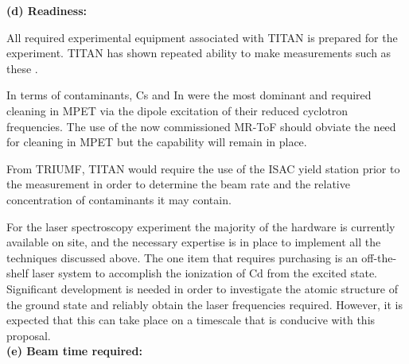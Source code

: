 \documentclass[12pt]{article}
\begin{document}
\noindent\textbf{(d) Readiness:}


All required experimental equipment associated with TITAN is prepared for the experiment. TITAN has shown repeated ability to make measurements such as these \cite{Gallant2012a,Simon2012,Ettenauer2011,Lapierre2012,Frekers2013,Ettenauer2013,Klawitter2015,Lascar2017}.

In terms of contaminants, Cs and In were the most dominant and required cleaning in MPET via the dipole excitation of their reduced cyclotron frequencies. The use of the now commissioned MR-ToF should obviate the need for cleaning in MPET but the capability will remain in place.

From TRIUMF, TITAN would require the use of the ISAC yield station prior to the measurement in order to determine the beam rate and the relative concentration of contaminants it may contain.

For the laser spectroscopy experiment the majority of the hardware is currently available on site, and the necessary expertise is in place to implement all the techniques discussed above. The one item that requires purchasing is an off-the-shelf laser system to accomplish the ionization of Cd from the excited state.  Significant development is needed in order to investigate the atomic structure of the ground state and reliably obtain the laser frequencies required. However, it is expected that this can take place on a timescale that is conducive with this proposal.\\

\noindent\textbf{(e) Beam time required:}
\end{document}
